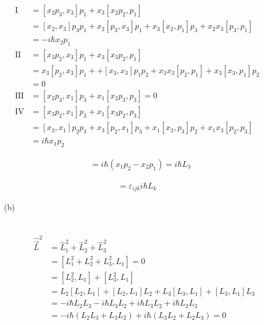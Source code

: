 \documentclass[11pt,a4paper]{article}
\begin{document}
\begin{enumerate}
\begin{align}
    \mbox{I}
    &=[x_2p_3,x_3]p_1+x_3[x_2p_2,p_1]\\
    &=[x_2,x_3]p_3p_1+x_2[p_3,x_3]p_1+x_3[x_2,p_1]p_3+x_2x_3[p_3,p_1]\\
    &=-i\hbar x_2p_1\\
    \mbox{II}
    &=[x_3p_2,x_3]p_1+x_3[x_3p_2,p_1]\\
    &=x_3[p_2,x_3]p_1++[x_3,x_3]p_1p_2+x_3x_3[p_2,p_1]+x_3[x_3,p_1]p_2\\
    &=0\\
    \mbox{III}
    &=[x_2p_3,x_1]p_3+x_1[x_2p_3,p_3]=0\\
    \mbox{IV}
    &=[x_3p_2,x_1]p_3+x_1[x_3p_2,p_3]\\
    &=[x_3,x_1]p_2p_3+x_3[p_2,x_1]p_3+x_1[x_3,p_3]p_2+x_1x_3[p_2,p_3]\\
    &=i\hbar x_1p_2
\end{align}

\begin{align}
    [L_1,L_2]&=i\hbar(x_1p_2-x_2p_1)=i\hbar L_3
\end{align}

\begin{align}
    [L_i,L_j]=\varepsilon_{ijk}i\hbar L_k
\end{align}

\end{enumerate}

\begin{enumerate}
\item[(b)]

\begin{align}
    [\hat{\vec{L}}_1^2,\hat{L}_1]
\end{align}

\begin{align}
    \hat{\vec{L}}^2&=\hat{L}_1^2+\hat{L}_2^2+\hat{L}_3^2\\
    &=[L_1^2+L_2^2+L_3^2,L_1]=0\\
    &=[L_2^2,L_1]+[L_3^2,L_1]\\
    &=L_2[L_2,L_1]+[L_2,L_1]L_2+L_3[L_3,L_1]+[L_3,L_1]L_3\\
        &=-i\hbar L_2L_3-i\hbar L_3L_2+i\hbar L_3L_2+i\hbar L_2L_3\\
&=-i\hbar(L_2L_3+L_3L_2)+i\hbar(L_3L_2+L_2L_3)=0
\end{align}

\end{enumerate}

\newpage
\end{document}
